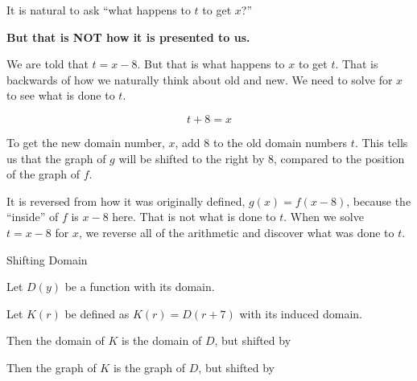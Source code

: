 \documentclass{ximera}
\begin{document}
It is natural to ask ``what happens to $t$ to get $x$?''  



\begin{center}
\textbf{\textcolor{red!70!black}{But that is NOT how it is presented to us.}}
\end{center}






We are told that $t=x-8$.  But that is what happens to $x$ to get $t$.  That is backwards of how we naturally think about old and new.  We need to solve for $x$ to see what is done to $t$.

\[ t+8=x \]

To get the new domain number, $x$, add $8$ to the old domain numbers $t$.  This tells us that the graph of $g$ will be shifted to the right by $8$, compared to the position of the graph of $f$.


It is reversed from how it was originally defined, $g(x) = f(x-8)$, because the ``inside'' of $f$ is $x-8$ here.  That is not what is done to $t$.  When we solve $t=x-8$ for $x$, we reverse all of the arithmetic and discover what was done to $t$.




\begin{example} Shifting Domain


Let $D(y)$ be a function with its domain.

Let $K(r)$ be defined as $K(r) = D(r+7)$ with its induced domain.


Then the domain of $K$ is the domain of $D$, but shifted  by 


Then the graph of $K$ is the graph of $D$, but shifted  by 




\end{example}
\end{document}
